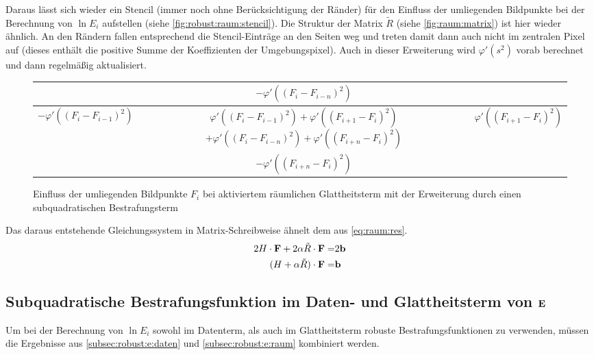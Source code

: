 Daraus lässt sich wieder ein Stencil (immer noch ohne Berücksichtigung der Ränder) für den Einfluss der umliegenden Bildpunkte bei der Berechnung von $\ln E_i$ aufstellen (siehe \autoref{fig:robust:raum:stencil}). Die Struktur der Matrix $\tilde R$ (siehe \autoref{fig:raum:matrix}) ist hier wieder ähnlich. An den Rändern fallen entsprechend die Stencil-Einträge an den Seiten weg und treten damit dann auch nicht im zentralen Pixel auf (dieses enthält die positive Summe der Koeffizienten der Umgebungspixel). Auch in dieser Erweiterung wird $\varphi'(s^2)$ vorab berechnet und dann regelmäßig aktualisiert.

\begin{figure}
  \begin{center}
    \begin{tabular}{c|c|c}
        \cline{2-2}
        & $-\varphi'((F_i - F_{i-n})^2)$ & \\
        \hline
            \multicolumn{1}{|c|}{$-\varphi'((F_i - F_{i-1})^2)$}
            & \shortstack{$\varphi'((F_i - F_{i-1})^2) + \varphi'((F_{i+1} - F_{i})^2) $ \\
              $ +\varphi'((F_i - F_{i-n})^2) + \varphi'((F_{i+n} - F_{i})^2)$} & 
            \multicolumn{1}{c|}{$\varphi'((F_{i+1} - F_{i})^2)$}\\
        \hline
        & $-\varphi'((F_{i+n} - F_{i})^2)$ & \\
        \cline{2-2} 
    \end{tabular}
  \end{center}
\caption{Einfluss der umliegenden Bildpunkte $F_i$ bei aktiviertem räumlichen Glattheitsterm mit der Erweiterung durch einen subquadratischen Bestrafungsterm}
\label{fig:robust:raum:stencil}
\end{figure}

Das daraus entstehende Gleichungssystem in Matrix-Schreibweise ähnelt dem aus \autoref{eq:raum:res}. 
\begin{align}
\label{eq:robust:raum:lgs}
2 H \cdot \mathbf F + 2 \alpha \tilde R\cdot \mathbf F =& 2 \mathbf b \\
(H+\alpha \tilde R)\cdot \mathbf F =& \mathbf b
\end{align}






\subsection{Subquadratische Bestrafungsfunktion im Daten- und Glattheitsterm von $\mathbf E$ }
Um bei der Berechnung von $\ln E_i$ sowohl im Datenterm, als auch im Glattheitsterm robuste Bestrafungsfunktionen zu verwenden, müssen die Ergebnisse aus \autoref{subsec:robust:e:daten} und \autoref{subsec:robust:e:raum} kombiniert werden.


